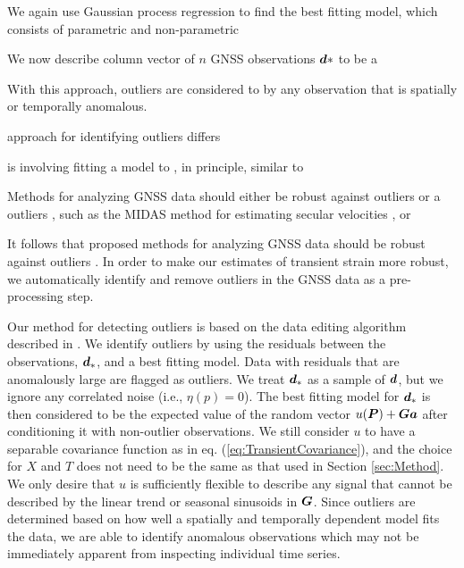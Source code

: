 \documentclass[extra,mreferee]{gji}
\begin{document}
We again use Gaussian process regression to find the best fitting model, which consists of parametric and non-parametric 

We now describe column vector of $n$ GNSS observations $\mitbf{d}*$ to be a   

With this approach, outliers are considered to by any observation that is spatially or temporally anomalous. 

approach for identifying outliers differs     

is involving fitting a model to , in principle, similar to 

   

Methods for analyzing GNSS data should either be robust against outliers or a outliers , such as the MIDAS method for estimating secular velocities \citep{Blewitt2016}, or   

It follows that proposed methods for analyzing GNSS data should be robust against outliers \citep[e.g.,][]{Blewitt2016}. In order to make our estimates of transient strain more robust, we automatically identify and remove outliers in the GNSS data as a pre-processing step.

Our method for detecting outliers is based on the data editing algorithm described in \citet{Acheson1975}. We identify outliers by using the residuals between the observations, $\mitbf{d}_*$, and a best fitting model. Data with residuals that are anomalously large are flagged as outliers. We treat $\mitbf{d}_*$ as a sample of $\mitbf{d}$, but we ignore any correlated noise (i.e., $\eta(p) = 0$).  The best fitting model for $\mitbf{d}_*$ is then considered to be the expected value of the random vector $u(\mitbf{P}) + \mitbf{G}\mitbf{a}$ after conditioning it with non-outlier observations.  We still consider $u$ to have a separable covariance function as in eq. (\ref{eq:TransientCovariance}), and the choice for $X$ and $T$ does not need to be the same as that used in Section \ref{sec:Method}. We only desire that $u$ is sufficiently flexible to describe any signal that cannot be described by the linear trend or seasonal sinusoids in $\mitbf{G}$. Since outliers are determined based on how well a spatially and temporally dependent model fits the data, we are able to identify anomalous observations which may not be immediately apparent from inspecting individual time series. 
\end{document}
